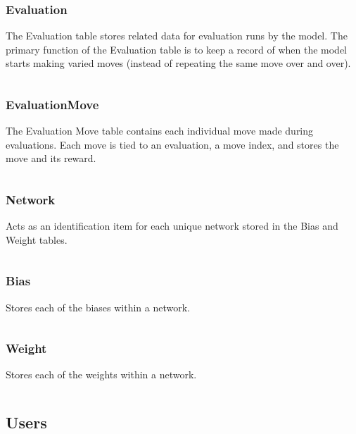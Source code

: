 \documentclass[12pt]{article}
\begin{document}
\inputminted{SQL}{../../sql/tables/epoch.sql}

\subsubsection{Evaluation}

The Evaluation table stores related data for evaluation runs by the model. The primary function of the Evaluation table is to keep a record of when the model starts making varied moves (instead of repeating the same move over and over).

\inputminted{SQL}{../../sql/tables/evaluation.sql}

\subsubsection{EvaluationMove}

The Evaluation Move table contains each individual move made during evaluations. Each move is tied to an evaluation, a move index, and stores the move and its reward.

\inputminted{SQL}{../../sql/tables/evaluationmove.sql}

\subsubsection{Network}

Acts as an identification item for each unique network stored in the Bias and Weight tables.

\inputminted{SQL}{../../sql/tables/network.sql}

\subsubsection{Bias}

Stores each of the biases within a network.

\inputminted{SQL}{../../sql/tables/bias.sql}

\subsubsection{Weight}

Stores each of the weights within a network.

\inputminted{SQL}{../../sql/tables/weight.sql}

\subsection{Users}
\end{document}
